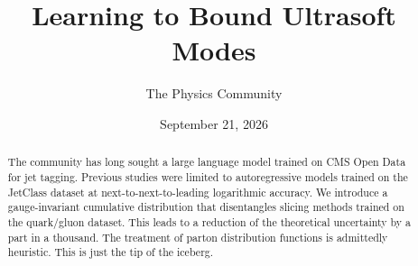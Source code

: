 \documentclass[11pt]{article}
\title{Learning to Bound Ultrasoft Modes}
\author{The Physics Community}
\date{September 21, 2026}
\begin{document}
\maketitle
\begin{abstract}
The community has long sought a large language model trained on CMS Open
Data for jet tagging. Previous studies were limited to autoregressive
models trained on the JetClass dataset at next-to-next-to-leading
logarithmic accuracy. We introduce a gauge-invariant cumulative
distribution that disentangles slicing methods trained on the
quark/gluon dataset. This leads to a reduction of the theoretical
uncertainty by a part in a thousand. The treatment of parton
distribution functions is admittedly heuristic. This is just the tip of
the iceberg.
\end{abstract}
\tableofcontents





\nocite{*}


\end{document}
